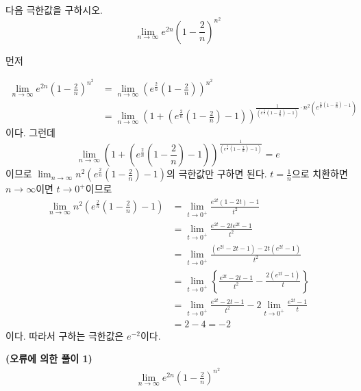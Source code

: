 \documentclass[11pt, a4paper]{book}
\begin{document}
	\begin{example}
		 다음 극한값을 구하시오.
		 \begin{equation*}
		 	\displaystyle\lim_{n\to\infty}e^{2n}\left(1-\frac{2}{n}\right)^{n^{2}}
		 \end{equation*}
	 \begin{solution}
	먼저
	
	\begin{align*}
		\displaystyle\lim_{n\to\infty}e^{2n}\left(1-\frac{2}{n}\right)^{n^{2}}
		& =\displaystyle\lim_{n\to\infty}\left(e^{\frac{2}{n}}\left(1-\frac{2}{n}\right)\right)^{n^{2}}\\
		& =\displaystyle\lim_{n\to\infty}\left(1+\left(e^{\frac{2}{n}}\left(1-\frac{2}{n}\right)-1\right)\right)^{\frac{1}{\left(e^{\frac{2}{n}}\left(1-\frac{2}{n}\right)-1\right)}\cdot n^{2}\left(e^{\frac{2}{n}\left(1-\frac{2}{n}\right)-1}\right)}
	\end{align*}
	이다. 그런데
	\begin{equation*}
		\displaystyle\lim_{n\to\infty}\left(1+\left(e^{\frac{2}{n}}\left(1-\frac{2}{n}\right)-1\right)\right)^{\frac{1}{\left(e^{\frac{2}{n}}\left(1-\frac{2}{n}\right)-1\right)}}= e
	\end{equation*}
	이므로 $\displaystyle\lim_{n\to\infty}n^{2}\left(e^{\frac{2}{n}}\left(1-\frac{2}{n}\right)-1\right)$의 극한값만 구하면 된다. $t =\frac{1}{n}$으로 치환하면 $n\to\infty$이면 $t\to 0^{+}$이므로 
	\begin{align*}
		\displaystyle\lim_{n\to\infty}n^{2}\left(e^{\frac{2}{n}}\left(1-\frac{2}{n}\right)-1\right)
		& =\displaystyle\lim_{t\to 0^{+}}\frac{e^{2t}(1-2t)-1}{t^{2}}\\
		& =\displaystyle\lim_{t\to 0^{+}}\frac{e^{2t}-2te^{2t}-1}{t^{2}}\\
		& =\displaystyle\lim_{t\to 0^{+}}\frac{(e^{2t}-2t-1)- 2t(e^{2t}-1)}{t^{2}}\\
		& =\displaystyle\lim_{t\to 0^{+}}\left\{\frac{e^{2t}-2t-1}{t^{2}}-\frac{2\left(e^{2t}-1\right)}{t}\right\}\\
		& =\displaystyle\lim_{t\to 0^{+}}\frac{e^{2t}-2t-1}{t^{2}}- 2\displaystyle\lim_{t\to 0^{+}}\frac{e^{2t}-1}{t}\\
		& = 2 -4 =-2
	\end{align*}
	이다. 따라서 구하는 극한값은 $e^{-2}$이다.  	
	 \end{solution}
 \begin{solution}\textbf{(오류에 의한 풀이 1)}
 		\begin{align*}
 		\displaystyle\lim_{n\to\infty}e^{2n}\left(1-\frac{2}{n}\right)^{n^{2}}

\end{align*}
\end{solution}
\end{example}
\end{document}
